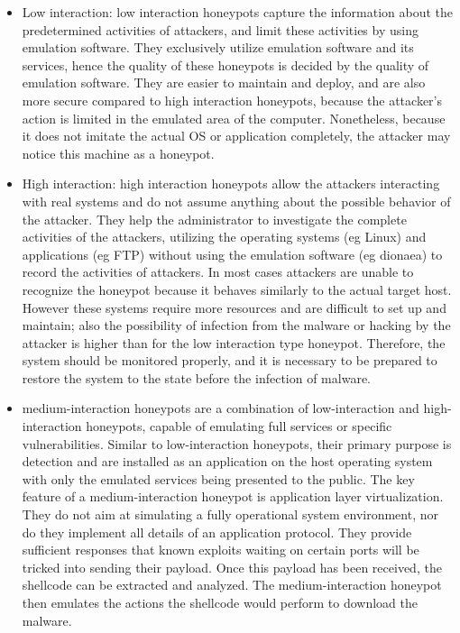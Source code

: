 \documentclass[epsfig,a4paper,11pt,titlepage,oneside,openany]{book}
\begin{document}
\begin{itemize}
\item Low interaction: low interaction honeypots capture the information about the predetermined activities of attackers, and limit these activities by using emulation software. They exclusively utilize emulation software and its services, hence the quality of these honeypots is decided by the quality of emulation software. They are easier to maintain and deploy, and are also more secure compared to high interaction honeypots, because the attacker’s action is limited in the emulated area of the computer. Nonetheless, because it does not imitate the actual OS or application completely, the attacker may notice this machine as a honeypot. 

\item High interaction: high interaction honeypots allow the attackers interacting with real systems and do not assume anything about the possible behavior of the attacker. They help the administrator to investigate the complete activities of the attackers, utilizing the operating systems (eg Linux) and applications (eg FTP) without using the emulation software (eg dionaea) to record the activities of attackers. In most cases attackers are unable to recognize the honeypot because it behaves similarly to the actual target host. However these systems require more resources and are difficult to set up and maintain; also the possibility of infection from the malware or hacking by the attacker is higher than for the low interaction type honeypot. Therefore, the system should be monitored properly, and it is necessary to be prepared to restore the system to the state before the infection of malware.
\item medium-interaction honeypots are a combination of low-interaction and high-interaction honeypots, capable of emulating full services or specific vulnerabilities. Similar to low-interaction honeypots, their primary purpose is detection and are installed as an application on the host operating system with only the emulated services being presented to the public. The key feature of a medium-interaction honeypot is application layer virtualization. They do not aim at simulating a fully operational system environment, nor do they implement all details of an application protocol. They provide sufficient responses that known exploits waiting on certain ports will be tricked into sending their payload. Once this payload has been received, the shellcode can be extracted and analyzed. The medium-interaction honeypot then emulates the actions the shellcode would perform to download the malware.
 
\end{itemize}
\end{document}
